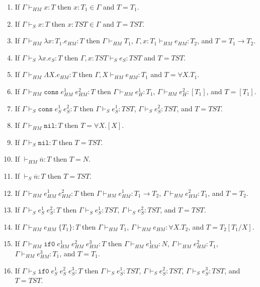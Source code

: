\begin{inversion}
\label{inversion}
\onehalfspacing
\mbox{}
\begin{enumerate}
\item If $\Gamma\vdash_{HM}x:T$ then $x:T_{1}\in\Gamma$ and $T=T_{1}$.
\item If $\Gamma\vdash_{S}x:T$ then $x:TST\in\Gamma$ and $T=TST$.
\item If $\Gamma\vdash_{HM}\lambda x:T_{1}.e_{HM}:T$ then $\Gamma\vdash_{HM}T_{1}$, $\Gamma,x:T_{1}\vdash_{HM}e_{HM}:T_{2}$, and $T=T_{1}\rightarrow T_{2}$.
\item If $\Gamma\vdash_{S}\lambda x.e_{S}:T$ then $\Gamma,x:TST\vdash_{S}e_{S}:TST$ and $T=TST$.
\item If $\Gamma\vdash_{HM}\Lambda X.e_{HM}:T$ then $\Gamma,X\vdash_{HM}e_{HM}:T_{1}$ and $T=\forall X.T_{1}$.
\item If $\Gamma\vdash_{HM}\mathtt{cons}\;e_{HM}^{1}\;e_{HM}^{2}:T$ then $\Gamma\vdash_{HM}e_{H}^{1}:T_{1}$, $\Gamma\vdash_{HM}e_{H}^{2}:[T_{1}]$, and $T=[T_{1}]$.
\item If $\Gamma\vdash_{S}\mathtt{cons}\;e_{S}^{1}\;e_{S}^{2}:T$ then $\Gamma\vdash_{S}e_{S}^{1}:TST$, $\Gamma\vdash_{S}e_{S}^{2}:TST$, and $T=TST$.
\item If $\Gamma\vdash_{HM}\mathtt{nil}:T$ then $T=\forall X.[X]$.
\item If $\Gamma\vdash_{S}\mathtt{nil}:T$ then $T=TST$.
\item If $\vdash_{HM}\overline{n}:T$ then $T=N$.
\item If $\vdash_{S}\overline{n}:T$ then $T=TST$.
\item If $\Gamma\vdash_{HM}e_{HM}^{1}\;e_{HM}^{2}:T$ then $\Gamma\vdash_{HM}e_{HM}^{1}:T_{1}\rightarrow T_{2}$, $\Gamma\vdash_{HM}e_{HM}^{2}:T_{1}$, and $T=T_{2}$.
\item If $\Gamma\vdash_{S}e_{S}^{1}\;e_{S}^{2}:T$ then $\Gamma\vdash_{S}e_{S}^{1}:TST$, $\Gamma\vdash_{S}e_{S}^{2}:TST$, and $T=TST$.
\item If $\Gamma\vdash_{HM}e_{HM}\;\lbrace T_{1}\rbrace:T$ then $\Gamma\vdash_{HM}T_{1}$, $\Gamma\vdash_{HM}e_{HM}:\forall X.T_{2}$, and $T=T_{2}[T_{1}/X]$.
\item If $\Gamma\vdash_{HM}\mathtt{if0}\;e_{HM}^{1}\;e_{HM}^{2}\;e_{HM}^{3}:T$ then $\Gamma\vdash_{HM}e_{HM}^{1}:N$, $\Gamma\vdash_{HM}e_{HM}^{2}:T_{1}$, $\Gamma\vdash_{HM}e_{HM}^{3}:T_{1}$, and $T=T_{1}$.
\item If $\Gamma\vdash_{S}\mathtt{if0}\;e_{S}^{1}\;e_{S}^{2}\;e_{S}^{3}:T$ then $\Gamma\vdash_{S}e_{S}^{1}:TST$, $\Gamma\vdash_{S}e_{S}^{2}:TST$, $\Gamma\vdash_{S}e_{S}^{3}:TST$, and $T=TST$.

\end{enumerate}
\end{inversion}
